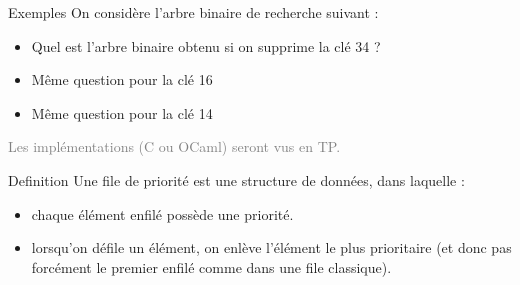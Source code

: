 \documentclass[10pt]{beamer}
\begin{document}
\begin{frame}[fragile]{\Ctitle}{\stitle}
	\begin{exampleblock}{Exemples}
		On considère l'arbre binaire de recherche suivant :
		\begin{center}
			{
				{
					{ 
						{ \Tn{}
						}}
				}
				{
					\Tn{}
				}}
		\end{center}
		\begin{itemize}
		\item Quel est l'arbre binaire obtenu si on supprime la clé 34 ?
		\item Même question pour la clé 16
		\item Même question pour la clé 14
		\end{itemize}
	\textcolor{gray}{Les implémentations (C ou OCaml) seront vus en TP.}
	\end{exampleblock}
\end{frame}


\begin{frame}[fragile]{\Ctitle}{\stitle}
	\begin{block}{Definition}
		Une file de priorité est une structure de données, dans laquelle :
		\begin{itemize}
			\item<2-> chaque élément enfilé possède une priorité.
			\item<3-> lorsqu'on défile un élément, on enlève l'élément le plus prioritaire (et donc pas forcément le premier enfilé comme dans une file classique).
		\end{itemize}
	\end{block}
\end{frame}
\end{document}
